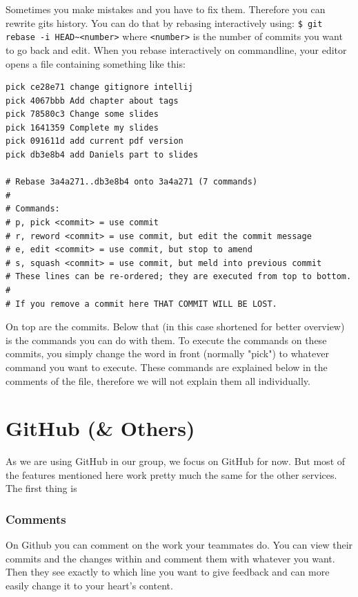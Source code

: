 \documentclass[a4paper, 12pt]{article}
\begin{document}
	Sometimes you make mistakes and you have to fix them. Therefore you can rewrite gits history. You can do that by rebasing interactively using:\newline
	\lstinline|$ git rebase -i HEAD~<number>|\newline
	where \lstinline|<number>| is the number of commits you want to go back and edit. When you rebase interactively on commandline, your editor opens a file containing something like this:
		\newpage
		\begin{lstlisting}[basicstyle=\tiny]
pick ce28e71 change gitignore intellij
pick 4067bbb Add chapter about tags
pick 78580c3 Change some slides
pick 1641359 Complete my slides
pick 091611d add current pdf version
pick db3e8b4 add Daniels part to slides

# Rebase 3a4a271..db3e8b4 onto 3a4a271 (7 commands)
#
# Commands:
# p, pick <commit> = use commit
# r, reword <commit> = use commit, but edit the commit message
# e, edit <commit> = use commit, but stop to amend
# s, squash <commit> = use commit, but meld into previous commit
# These lines can be re-ordered; they are executed from top to bottom.                                                           
#
# If you remove a commit here THAT COMMIT WILL BE LOST.
		\end{lstlisting}
		
		On top are the commits. Below that (in this case shortened for better overview) is the commands you can do with them. To execute the commands on these commits, you simply change the word in front (normally "pick") to whatever command you want to execute. These commands are explained below in the comments of the file, therefore we will not explain them all individually.
	\section{GitHub (\& Others)}
		
		As we are using GitHub in our group, we focus on GitHub for now. But most of the features mentioned here work pretty much the same for the other services. The first thing is 

		\subsubsection{Comments}
		
			On Github you can comment on the work your teammates do. You can view their commits and the changes within and comment them with whatever you want. Then they see exactly to which line you want to give feedback and can more easily change it to your heart's content.
\end{document}
